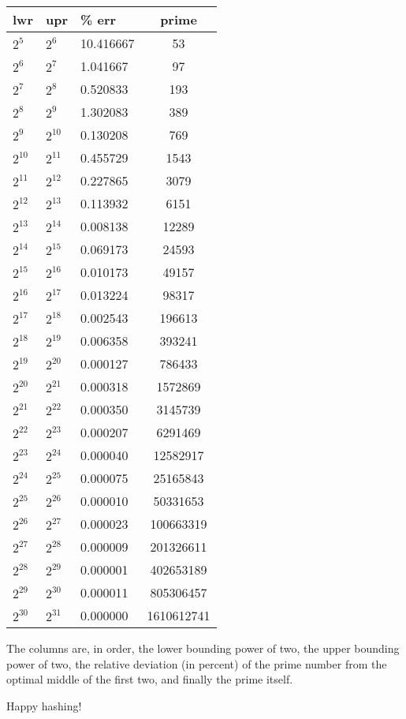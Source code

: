 \documentclass[12pt]{article}
\begin{document}
\begin{center}
\begin{tabular}{lllc}
lwr & upr & \% err & prime  \\
\hline
$2^{5}$ & $2^{6}$ & 10.416667 & 53 \\
$2^{6}$ & $2^{7}$ & 1.041667 & 97 \\
$2^{7}$ & $2^{8}$ & 0.520833 & 193 \\
$2^{8}$ & $2^{9}$ & 1.302083 & 389 \\
$2^{9}$ & $2^{10}$ & 0.130208 & 769 \\
$2^{10}$ & $2^{11}$ & 0.455729 & 1543 \\
$2^{11}$ & $2^{12}$ & 0.227865 & 3079 \\
$2^{12}$ & $2^{13}$ & 0.113932 & 6151 \\
$2^{13}$ & $2^{14}$ & 0.008138 & 12289 \\
$2^{14}$ & $2^{15}$ & 0.069173 & 24593 \\
$2^{15}$ & $2^{16}$ & 0.010173 & 49157 \\
$2^{16}$ & $2^{17}$ & 0.013224 & 98317 \\
$2^{17}$ & $2^{18}$ & 0.002543 & 196613 \\
$2^{18}$ & $2^{19}$ & 0.006358 & 393241 \\
$2^{19}$ & $2^{20}$ & 0.000127 & 786433 \\
$2^{20}$ & $2^{21}$ & 0.000318 & 1572869 \\
$2^{21}$ & $2^{22}$ & 0.000350 & 3145739 \\
$2^{22}$ & $2^{23}$ & 0.000207 & 6291469 \\
$2^{23}$ & $2^{24}$ & 0.000040 & 12582917 \\
$2^{24}$ & $2^{25}$ & 0.000075 & 25165843 \\
$2^{25}$ & $2^{26}$ & 0.000010 & 50331653 \\
$2^{26}$ & $2^{27}$ & 0.000023 & 100663319 \\
$2^{27}$ & $2^{28}$ & 0.000009 & 201326611 \\
$2^{28}$ & $2^{29}$ & 0.000001 & 402653189 \\
$2^{29}$ & $2^{30}$ & 0.000011 & 805306457 \\
$2^{30}$ & $2^{31}$ & 0.000000 & 1610612741 
\end{tabular}
\end{center}

The columns are, in order, the lower bounding power of two, the upper bounding power of two, the relative deviation (in percent) of the prime number from the optimal middle of the first two, and finally the prime itself.

Happy hashing!
\end{document}
